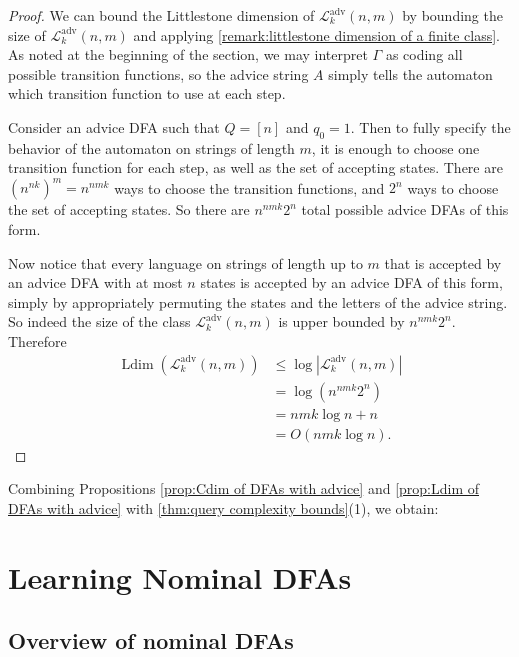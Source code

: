 \documentclass[11pt,a4paper]{amsart}
\theoremstyle{definition}
\newcommand{\mc}{\mathcal}
\DeclareMathOperator{\Ldim}{Ldim}
\begin{document}
\begin{proof}
    We can bound the Littlestone dimension of $\mc L^{\text{adv}}_k(n,m)$ by bounding the size of $\mc L^{\text{adv}}_k(n,m)$ and applying \autoref{remark:littlestone dimension of a finite class}.
    As noted at the beginning of the section, we may interpret $\Gamma$ as coding all possible transition functions, so the advice string $A$ simply tells the automaton which transition function to use at each step. 
    
    Consider an advice DFA such that $Q = [n]$ and $q_0 = 1$. 
    Then to fully specify the behavior of the automaton on strings of length $m$, it is enough to choose one transition function for each step, as well as the set of accepting states. 
    There are $(n^{nk})^m = n^{nmk}$ ways to choose the transition functions, and $2^n$ ways to choose the set of accepting states. 
    So there are $n^{nmk} 2^n$ total possible advice DFAs of this form. 
    
    Now notice that every language on strings of length up to $m$ that is accepted by an advice DFA with at most $n$ states is accepted by an advice DFA of this form, simply by appropriately permuting the states and the letters of the advice string. 
    So indeed the size of the class $\mc L^{\text{adv}}_k(n,m)$ is upper bounded by $n^{nmk} 2^n$.
    Therefore
    \begin{align*}
    \Ldim(\mc L^{\text{adv}}_k(n,m)) &\leq \log |\mc L^{\text{adv}}_k(n,m)| \\
    &= \log(n^{nmk} 2^n) \\
    &= nmk \log n + n \\
    &= O(nmk \log n).
    \end{align*}
\end{proof}

Combining Propositions \ref{prop:Cdim of DFAs with advice} and \ref{prop:Ldim of DFAs with advice} with \autoref{thm:query complexity bounds}(1), we obtain:

\adviceLC



\section{Learning Nominal DFAs} \label{section:complexity of nominal DFAs}

\subsection{Overview of nominal DFAs}
\end{document}
